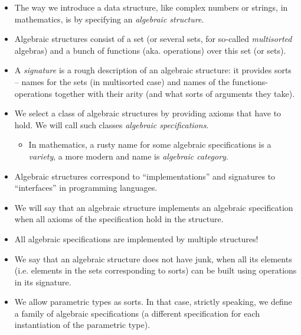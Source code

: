 \documentclass{beamer}
\newcommand{\tmem}[1]{{\em #1\/}}
\begin{document}
\begin{itemize}
  \item The way we introduce a data structure, like complex numbers or
  strings, in mathematics, is by specifying an {\tmem{algebraic structure}}.
  
  \item Algebraic structures consist of a set (or several sets, for so-called
  {\tmem{multisorted}} algebras) and a bunch of functions (aka. operations)
  over this set (or sets).
  
  \item A {\tmem{signature}} is a rough description of an algebraic structure:
  it provides sorts -- names for the sets (in multisorted case) and names of
  the functions-operations together with their arity (and what sorts of
  arguments they take).
  
  \item We select a class of algebraic structures by providing axioms that
  have to hold. We will call such classes {\tmem{algebraic specifications}}.
  \begin{itemize}
    \item In mathematics, a rusty name for some algebraic specifications is a
    {\tmem{variety}}, a more modern and name is {\tmem{algebraic category}}.
  \end{itemize}
  \item Algebraic structures correspond to ``implementations'' and signatures
  to ``interfaces'' in programming languages.
  
  \item We will say that an algebraic structure implements an algebraic
  specification when all axioms of the specification hold in the structure.
  
  \item All algebraic specifications are implemented by multiple structures!
  
  \item We say that an algebraic structure does not have junk, when all its
  elements (i.e. elements in the sets corresponding to sorts) can be built
  using operations in its signature.
  
  \item We allow parametric types as sorts. {\small{In that case, strictly
  speaking, we define a family of algebraic specifications (a different
  specification for each instantiation of the parametric type).}}
\end{itemize}
\end{document}
